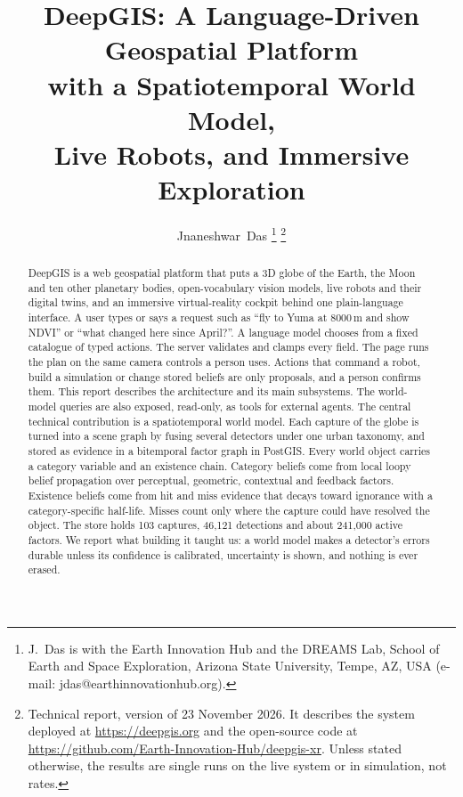 \documentclass[journal]{IEEEtran}
\begin{document}
\title{DeepGIS: A Language-Driven Geospatial Platform\\
with a Spatiotemporal World Model,\\
Live Robots, and Immersive Exploration}

\author{Jnaneshwar~Das%
\thanks{J.~Das is with the Earth Innovation Hub and the DREAMS Lab, School of Earth and Space
Exploration, Arizona State University, Tempe, AZ, USA (e-mail: jdas@earthinnovationhub.org).}%
\thanks{Technical report, version of 23 November 2026. It describes the system deployed at
\url{https://deepgis.org} and the open-source code at
\url{https://github.com/Earth-Innovation-Hub/deepgis-xr}. Unless stated otherwise, the results are
single runs on the live system or in simulation, not rates.}}

\maketitle

\begin{abstract}
DeepGIS is a web geospatial platform that puts a 3D globe of the Earth, the Moon and ten other
planetary bodies, open-vocabulary vision models, live robots and their digital twins, and an
immersive virtual-reality cockpit behind one plain-language interface. A user types or says a
request such as ``fly to Yuma at 8000\,m and show NDVI'' or ``what changed here since April?''.
A language model chooses from a fixed catalogue of typed actions. The server validates and clamps
every field. The page runs the plan on the same camera controls a person uses. Actions that
command a robot, build a simulation or change stored beliefs are only proposals, and a person
confirms them. This report describes the architecture and its main subsystems.
The world-model queries are also exposed, read-only, as tools for external agents.
The central technical contribution is a spatiotemporal world model. Each capture of the globe
is turned into a scene graph by fusing several detectors under one urban taxonomy, and stored
as evidence in a bitemporal factor graph in PostGIS. Every world object carries a category variable
and an existence chain. Category beliefs come from local loopy belief propagation over perceptual,
geometric, contextual and feedback factors. Existence beliefs come from hit and miss evidence that
decays toward ignorance with a category-specific half-life. Misses count only where the capture
could have resolved the object. The store holds 103 captures, 46{,}121 detections and about
241{,}000 active factors. We report what building it taught us: a world model makes a detector's
errors durable unless its confidence is calibrated, uncertainty is shown, and nothing is ever erased.
\end{abstract}
\end{document}
